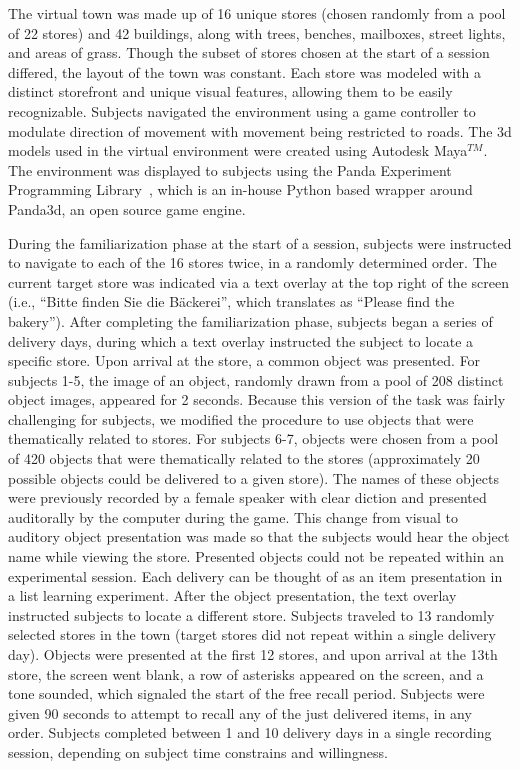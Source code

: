 The virtual town was made up of 16 unique stores (chosen randomly from a pool of 22 stores) and 42 buildings, along with trees, benches, mailboxes, street lights, and areas of grass.  Though the subset of stores chosen at the start of a session differed, the layout of the town was constant. Each store was modeled with a distinct storefront and unique visual features, allowing them to be easily recognizable.  Subjects navigated the environment using a game controller to modulate direction of movement with movement being restricted to roads.  The 3d models used in the virtual environment were created using Autodesk Maya$^{TM}$. The environment was displayed to subjects using the Panda Experiment Programming Library~\cite{SolwEtal13}, which is an in-house Python based wrapper around Panda3d, an open source game engine.

During the familiarization phase at the  start of a session, subjects  were instructed to navigate to each of the 16 stores twice, in a randomly determined order. The current target store was indicated via a text overlay at the top right of the screen (i.e., ``Bitte finden Sie die B\"{a}ckerei'', which translates as ``Please find the bakery''). After completing the familiarization phase, subjects began a series of delivery days, during which a text overlay instructed the subject to locate a specific store. Upon arrival at the store, a common object was presented.  For subjects 1-5, the image of an object, randomly drawn from a pool of 208 distinct object images, appeared for 2 seconds. Because this version of the task was fairly challenging for subjects, we modified the procedure to use objects that were thematically related to stores.  For subjects 6-7, objects were  chosen from a pool of 420 objects that were thematically related to the stores (approximately 20 possible objects could be delivered to a given store). The names of these objects were previously recorded by a female speaker with clear diction and presented auditorally by the computer during the game.  This change from visual to auditory object presentation was made so that the subjects would hear the object name while viewing the store.  Presented objects could not be repeated within an experimental session. Each delivery can be thought of as an item presentation in a list learning experiment.  After the object presentation, the text overlay instructed subjects to locate a different store. Subjects traveled to 13 randomly selected stores in the town (target stores did not repeat within a single delivery day).  Objects were presented at the first 12 stores, and upon arrival at the 13th store, the screen went blank, a row of asterisks appeared on the screen, and a tone sounded, which signaled the start of the free recall period.  Subjects were given 90 seconds to attempt to recall any of the just delivered items, in any order.  Subjects completed between 1 and 10 delivery days in a single recording session, depending on subject time constrains and willingness.

